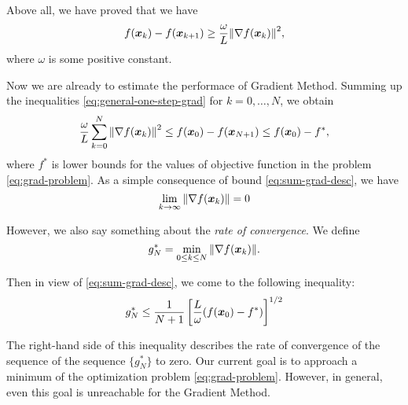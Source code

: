 Above all, we have proved that we have
\begin{equation}\label{eq:general-one-step-grad}
    f(\bm{x}_k) - f(\bm{x}_{k+1}) \ge \frac{\omega}{L} \norm{\nabla f(\bm{x}_k)}^2,
\end{equation} 
where \(\omega\) is some positive constant.

Now we are already to estimate the performace of Gradient Method. Summing up the 
inequalities \ref{eq:general-one-step-grad} for \(k = 0, \dots, N\), we obtain
\begin{equation}\label{eq:sum-grad-desc}
    \frac{\omega}{L} \sum_{k=0}^N \norm{\nabla f(\bm{x}_k)}^2 \le f(\bm{x}_0) - f(\bm{x}_{N+1}) \le f(\bm{x}_0) - f^*,  
\end{equation}
where \(f^*\) is lower bounds for the values of objective function in the problem \ref{eq:grad-problem}. As 
a simple consequence of bound \ref{eq:sum-grad-desc}, we have
\[
    \lim_{k\to \infty}\norm{\nabla f(\bm{x}_k)} = 0  
\]

However, we also say something about the \emph{rate of convergence}. We define
\[
    g_N^* = \min_{0 \le k \le N} \norm{\nabla f(\bm{x}_k)}.  
\]

Then in view of \ref{eq:sum-grad-desc}, we come to the following inequality:
\begin{equation}\label{eq:rate-of-convergence-gN}
    g_N^* \le \frac{1}{N+1}\left[\frac{L}{\omega} (f(\bm{x}_0) - f^*)\right]^{1/2}
\end{equation}

The right-hand side of this inequality describes the rate of convergence of the sequence of the sequence \(\{g_N^*\}\) to zero.
Our current goal is to approach a minimum of the optimization problem \ref{eq:grad-problem}.
However, in general, even this goal is unreachable for the Gradient Method.

